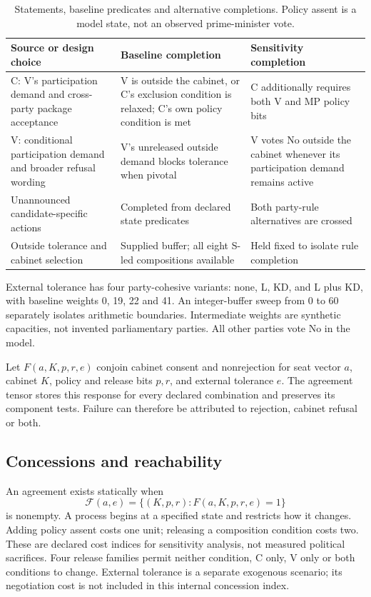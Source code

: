 \documentclass[11pt,a4paper]{article}
\newcommand{\Feas}{\mathcal{F}}
\begin{document}
\begin{table}[htbp]\centering\small
\caption{Statements, baseline predicates and alternative completions. Policy assent is a model state, not an observed prime-minister vote.}\label{tab:coding}
\begin{tabularx}{\linewidth}{>{\raggedright\arraybackslash}p{.22\linewidth}YY}\toprule
Source or design choice & Baseline completion & Sensitivity completion\\\midrule
C: V's participation demand and cross-party package acceptance & V is outside the cabinet, or C's exclusion condition is relaxed; C's own policy condition is met & C additionally requires both V and MP policy bits\\
V: conditional participation demand and broader refusal wording & V's unreleased outside demand blocks tolerance when pivotal & V votes No outside the cabinet whenever its participation demand remains active\\
Unannounced candidate-specific actions & Completed from declared state predicates & Both party-rule alternatives are crossed\\
Outside tolerance and cabinet selection & Supplied buffer; all eight S-led compositions available & Held fixed to isolate rule completion\\\bottomrule
\end{tabularx}
\end{table}

External tolerance has four party-cohesive variants: none, L, KD, and L plus KD, with baseline weights 0, 19, 22 and 41. An integer-buffer sweep from 0 to 60 separately isolates arithmetic boundaries. Intermediate weights are synthetic capacities, not invented parliamentary parties. All other parties vote No in the model.

Let \(F(a,K,p,r,e)\) conjoin cabinet consent and nonrejection for seat vector \(a\), cabinet \(K\), policy and release bits \(p,r\), and external tolerance \(e\). The agreement tensor stores this response for every declared combination and preserves its component tests. Failure can therefore be attributed to rejection, cabinet refusal or both.

\subsection{Concessions and reachability}

An agreement exists statically when
\[
\Feas(a,e)=\{(K,p,r):F(a,K,p,r,e)=1\}
\]
is nonempty. A process begins at a specified state and restricts how it changes. Adding policy assent costs one unit; releasing a composition condition costs two. These are declared cost indices for sensitivity analysis, not measured political sacrifices. Four release families permit neither condition, C only, V only or both conditions to change. External tolerance is a separate exogenous scenario; its negotiation cost is not included in this internal concession index.
\end{document}
